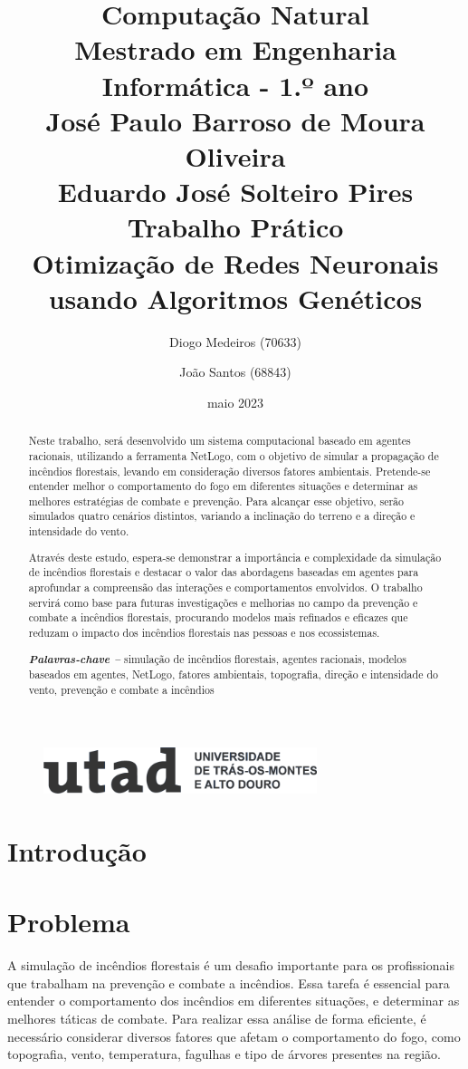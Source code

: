 \documentclass[a4paper, portuguese]{report}
\title{{\bf Computação Natural}\\ Mestrado em Engenharia Informática - 1.º ano\\\vspace*{1cm} José Paulo Barroso de Moura Oliveira\\ Eduardo José Solteiro Pires\\\vspace*{3cm}\textbf{Trabalho Prático}\\\vspace*{0.5cm} Otimização de Redes Neuronais usando Algoritmos Genéticos \vspace*{1cm}}
\author{Diogo Medeiros (70633) \and João Santos (68843)}
\date{maio 2023}
\providecommand{\keywords}[1]
{
  \small	
  \textbf{\textit{Palavras-chave --}} #1
}
\begin{document}
\begin{figure}
\includegraphics[width=8cm]{images/utad.png}
\end{figure}

\maketitle

\begin{abstract}

Neste trabalho, será desenvolvido um sistema computacional baseado em agentes racionais, utilizando a ferramenta NetLogo, com o objetivo de simular a propagação de incêndios florestais, levando em consideração diversos fatores ambientais. Pretende-se entender melhor o comportamento do fogo em diferentes situações e determinar as melhores estratégias de combate e prevenção. Para alcançar esse objetivo, serão simulados quatro cenários distintos, variando a inclinação do terreno e a direção e intensidade do vento.

Através deste estudo, espera-se demonstrar a importância e complexidade da simulação de incêndios florestais e destacar o valor das abordagens baseadas em agentes para aprofundar a compreensão das interações e comportamentos envolvidos. O trabalho servirá como base para futuras investigações e melhorias no campo da prevenção e combate a incêndios florestais, procurando modelos mais refinados e eficazes que reduzam o impacto dos incêndios florestais nas pessoas e nos ecossistemas.

\keywords{simulação de incêndios florestais, agentes racionais, modelos baseados em agentes, NetLogo, fatores ambientais, topografia, direção e intensidade do vento, prevenção e combate a incêndios}

\end{abstract}

\tableofcontents
\listoffigures
\listoftables
\listofalgorithms

\chapter{Introdução}\label{chapter:introduction}


\chapter{Problema}\label{chapter:problem}
A simulação de incêndios florestais é um desafio importante para os profissionais que trabalham na prevenção e combate a incêndios. Essa tarefa é essencial para entender o comportamento dos incêndios em diferentes situações, e determinar as melhores táticas de combate. Para realizar essa análise de forma eficiente, é necessário considerar diversos fatores que afetam o comportamento do fogo, como topografia, vento, temperatura, fagulhas e tipo de árvores presentes na região.
\end{document}
